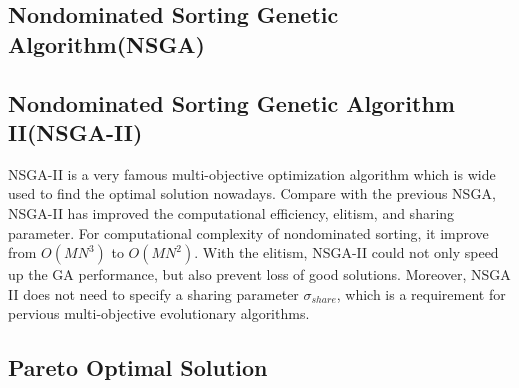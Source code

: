 \subsection{Nondominated Sorting Genetic Algorithm(NSGA)}

\subsection{Nondominated Sorting Genetic Algorithm II(NSGA-II)}
NSGA-II\cite{NSGA-II} is a very famous multi-objective optimization algorithm which is wide used  to find the optimal solution nowadays. Compare with the previous NSGA, NSGA-II has improved the computational efficiency, elitism, and sharing parameter. For computational complexity of nondominated sorting, it improve from \(O(MN^{3})\) to \(O(MN^{2})\). With the elitism, NSGA-II could not only speed up the GA performance, but also prevent loss of good solutions. Moreover, NSGA II does not need to specify a sharing parameter \(\sigma_{share}\), which is a requirement for pervious multi-objective evolutionary algorithms.

\subsection{Pareto Optimal Solution}

